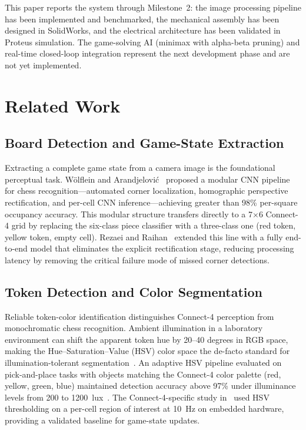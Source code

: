 \documentclass[conference]{IEEEtran}
\begin{document}
This paper reports the system through Milestone~2: the image processing
pipeline has been implemented and benchmarked, the mechanical assembly has been
designed in SolidWorks, and the electrical architecture has been validated in
Proteus simulation. The game-solving AI (minimax with alpha-beta pruning) and
real-time closed-loop integration represent the next development phase and are
not yet implemented.

\section{Related Work}
\label{sec:related}

\subsection{Board Detection and Game-State Extraction}

Extracting a complete game state from a camera image is the foundational
perceptual task. W\"{o}lflein and Arandjelovi\'{c}~\cite{Wolflein2021} proposed
a modular CNN pipeline for chess recognition—automated corner localization,
homographic perspective rectification, and per-cell CNN inference—achieving
greater than 98\% per-square occupancy accuracy. This modular structure
transfers directly to a 7\(\times\)6 Connect-4 grid by replacing the
six-class piece classifier with a three-class one (red token, yellow token,
empty cell). Rezaei and Raihan~\cite{Rezaei2023} extended this line with a
fully end-to-end model that eliminates the explicit rectification stage,
reducing processing latency by removing the critical failure mode of missed
corner detections.

\subsection{Token Detection and Color Segmentation}

Reliable token-color identification distinguishes Connect-4 perception from
monochromatic chess recognition. Ambient illumination in a laboratory
environment can shift the apparent token hue by 20--40 degrees in RGB space,
making the Hue--Saturation--Value (HSV) color space the de-facto standard for
illumination-tolerant segmentation~\cite{Park2024}. An adaptive HSV pipeline
evaluated on pick-and-place tasks with objects matching the Connect-4 color
palette (red, yellow, green, blue) maintained detection accuracy above 97\%
under illuminance levels from 200 to 1200~lux~\cite{Park2024}. The
Connect-4-specific study in~\cite{Zubek2021} used HSV thresholding on a
per-cell region of interest at 10~Hz on embedded hardware, providing a
validated baseline for game-state updates.
\end{document}
